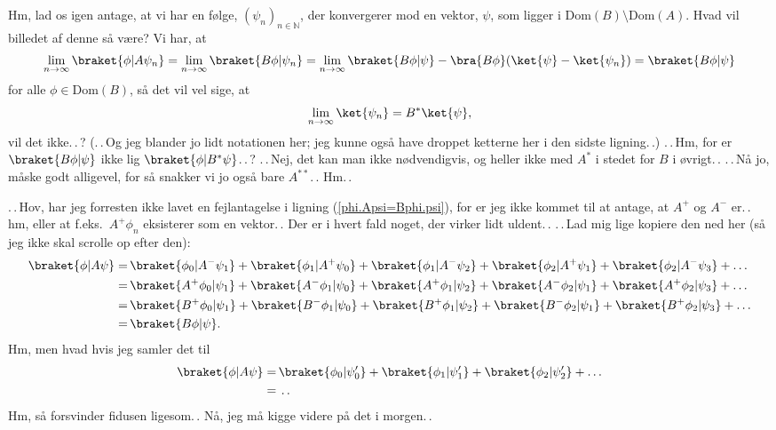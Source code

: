 \documentclass{report}
\begin{document}
Hm, lad os igen antage, at vi har en følge, $(\psi_n)_{n\in\mathbb N}$, der konvergerer mod en vektor, $\psi$, som ligger i $\mathrm{Dom}(B) \setminus \mathrm{Dom}(A)$. Hvad vil billedet af denne så være? Vi har, at 
\begin{align}
\begin{aligned}
	\lim_{n\to \infty} \braket{\phi| A \psi_n} =
	\lim_{n\to \infty}\braket{B \phi| \psi_n} = 
	\lim_{n\to \infty}\braket{B \phi| \psi} - \bra{B \phi}(\ket{\psi} - \ket{\psi_n}) =
	\braket{B \phi| \psi}
\end{aligned}
\end{align}
for alle $\phi \in \mathrm{Dom}(B)$, så det vil vel sige, at 
\begin{align}
\begin{aligned}
	\lim_{n\to \infty} \ket{\psi_n} =
	 B^* \ket{\psi},
\end{aligned}
\end{align}
vil det ikke.\,.\,? (.\,.\,Og jeg blander jo lidt notationen her; jeg kunne også have droppet ketterne her i den sidste ligning.\,.) .\,.\,Hm, for er $\braket{B \phi| \psi}$ ikke lig $\braket{\phi| B^*\psi}$.\,.\,? .\,.\,Nej, det kan man ikke nødvendigvis, og heller ikke med $A^*$ i stedet for $B$ i øvrigt.\,. .\,.\,Nå jo, måske godt alligevel, for så snakker vi jo også bare $A^{**}$.\,. Hm.\,. 

.\,.\,Hov, har jeg forresten ikke lavet en fejlantagelse i ligning (\ref{phi.Apsi=Bphi.psi}), for er jeg ikke kommet til at antage, at $A^+$ og $A^-$ er.\,. hm, eller at f.eks.\ $A^+\phi_n$ eksisterer som en vektor.\,. Der er i hvert fald noget, der virker lidt uldent.\,. .\,.\,Lad mig lige kopiere den ned her (så jeg ikke skal scrolle op efter den):
\begin{align}
	\begin{aligned}
	\braket{\phi| A \psi} =&\,
		\braket{\phi_0| A^- \psi_1} + \braket{\phi_1| A^+ \psi_0} + \braket{\phi_1| A^- \psi_2} + \braket{\phi_2| A^+ \psi_1} + \braket{\phi_2| A^- \psi_3} + \ldots \\
		=&\,
		\braket{A^+ \phi_0| \psi_1} + \braket{A^- \phi_1| \psi_0} + \braket{A^+ \phi_1| \psi_2} + \braket{A^- \phi_2| \psi_1} + \braket{A^+ \phi_2| \psi_3} + \ldots \\
		=&\,
		\braket{B^+ \phi_0| \psi_1} + \braket{B^- \phi_1| \psi_0} + \braket{B^+ \phi_1| \psi_2} + \braket{B^- \phi_2| \psi_1} + \braket{B^+ \phi_2| \psi_3} + \ldots \\
		=&\,
		\braket{B \phi| \psi}.
\end{aligned}
\end{align}
Hm, men hvad hvis jeg samler det til
\begin{align}
\begin{aligned}
\braket{\phi| A \psi} =&\,
\braket{\phi_0 | \psi_0'} + \braket{\phi_1 | \psi_1'} + \braket{\phi_2 | \psi_2'} + \ldots \\
=&\, \:.\,.
\end{aligned}
\end{align}
Hm, så forsvinder fidusen ligesom.\,. Nå, jeg må kigge videre på det i morgen.\,. 
\end{document}
